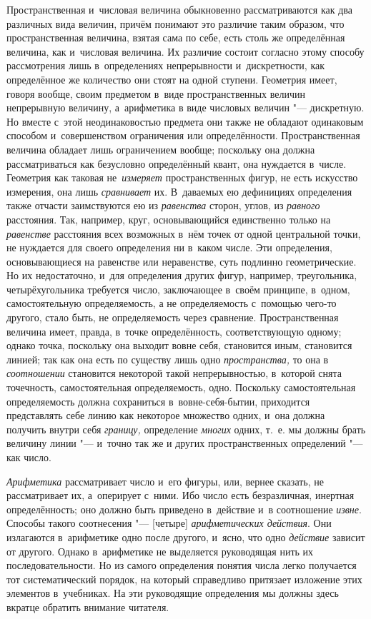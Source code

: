 
Пространственная и~числовая величина обыкновенно рассматриваются как два
различных вида величин, причём понимают это различие таким образом, что
пространственная величина, взятая сама по себе, есть столь же определённая
величина, как и~числовая величина. Их различие состоит согласно этому способу
рассмотрения лишь в~определениях непрерывности и~дискретности, как определённое
же количество они стоят на одной ступени. Геометрия имеет, говоря вообще, своим
предметом в~виде пространственных величин непрерывную величину, а~арифметика в
виде числовых величин "--- дискретную. Но вместе с~этой неодинаковостью
предмета они также не обладают одинаковым способом и~совершенством ограничения
или определённости. Пространственная величина обладает лишь ограничением
вообще; поскольку она должна рассматриваться как безусловно определённый
квант, она нуждается в~числе. Геометрия как таковая не~{\em измеряет}
пространственных фигур, не есть искусство измерения, она лишь {\em сравнивает}
их. В~даваемых ею дефинициях определения также отчасти заимствуются ею из
{\em равенства} сторон, углов, из {\em равного} расстояния. Так, например,
круг, основывающийся единственно только на {\em равенстве} расстояния всех
возможных в~нём точек от одной центральной точки, не нуждается для своего
определения ни в~каком числе. Эти определения, основывающиеся на равенстве или
неравенстве, суть подлинно геометрические. Но их недостаточно, и~для
определения других фигур, например, треугольника, четырёхугольника требуется
число, заключающее в~своём принципе, в~одном, самостоятельную определяемость,
а не определяемость с~помощью чего-то другого, стало быть, не определяемость
через сравнение. Пространственная величина имеет, правда, в~точке
определённость, соответствующую одному; однако точка, поскольку она выходит вовне
себя, становится иным, становится линией; так как она есть по существу
лишь одно {\em пространства,} то она в {\em соотношении} становится некоторой
такой непрерывностью, в~которой снята точечность, самостоятельная
определяемость, одно. Поскольку самостоятельная определяемость должна
сохраниться в~вовне-себя-бытии, приходится представлять себе линию как некоторое
множество одних, и~она должна получить внутри себя {\em границу,} определение
{\em многих} одних, т.~е. мы должны брать величину линии "--- и~точно так же и
других пространственных определений "--- как число.

{\em Арифметика} рассматривает число и~его фигуры, или, вернее сказать, не
рассматривает их, а~оперирует с~ними. Ибо число есть безразличная, инертная
определённость; оно должно быть приведено в~действие и~в соотношение
{\em извне}. Способы такого соотнесения "--- [четыре] {\em арифметических действия}.
Они излагаются в~арифметике одно после другого, и~ясно, что одно {\em действие}
зависит от другого. Однако в~арифметике не выделяется руководящая нить их
последовательности. Но из самого определения понятия числа легко получается тот
систематический порядок, на который справедливо притязает изложение этих
элементов в~учебниках. На эти руководящие определения мы должны здесь вкратце
обратить внимание читателя.

